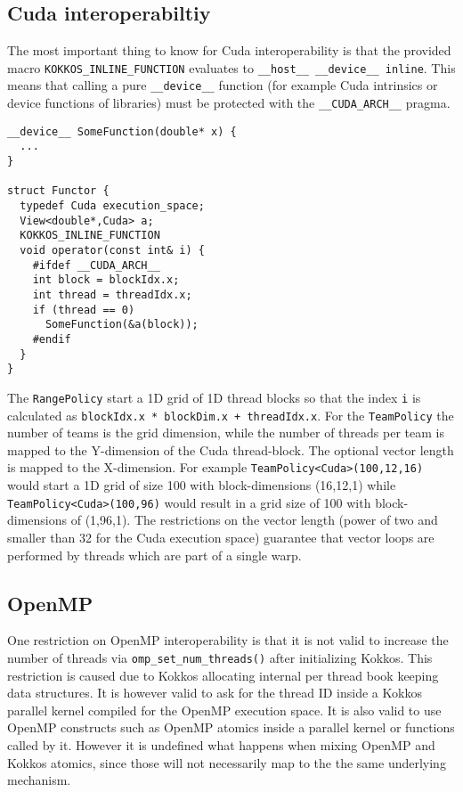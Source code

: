 \subsection{Cuda interoperabiltiy}

The most important thing to know for Cuda interoperability is that the provided macro
\lstinline|KOKKOS_INLINE_FUNCTION| evaluates to 
\lstinline|__host__ __device__ inline|. This means that calling a pure
\lstinline|__device__| function (for example Cuda intrinsics or device 
functions of libraries) must be protected with the \lstinline|__CUDA_ARCH__|
pragma.

\begin{lstlisting}
__device__ SomeFunction(double* x) {
  ...
}

struct Functor {
  typedef Cuda execution_space;
  View<double*,Cuda> a;
  KOKKOS_INLINE_FUNCTION
  void operator(const int& i) {
    #ifdef __CUDA_ARCH__
    int block = blockIdx.x;
    int thread = threadIdx.x;
    if (thread == 0)
      SomeFunction(&a(block));
    #endif
  }
}
\end{lstlisting}

The \lstinline|RangePolicy| start a 1D grid of 1D thread blocks so that the index 
\lstinline|i| is calculated as \lstinline|blockIdx.x * blockDim.x + threadIdx.x|. 
For the \lstinline|TeamPolicy| the number of teams is the grid dimension, while
the number of threads per team is mapped to the Y-dimension of the Cuda 
thread-block. The optional vector length is mapped to the X-dimension. 
For example \lstinline|TeamPolicy<Cuda>(100,12,16)| would start a 1D grid of size 
100 with block-dimensions (16,12,1) while \lstinline|TeamPolicy<Cuda>(100,96)| would 
result in a grid size of 100 with block-dimensions of (1,96,1). The restrictions on the 
vector length (power of two and smaller than 32 for the Cuda execution space) 
guarantee that vector loops are performed by threads which are part of a single 
warp. 

\subsection{OpenMP}

One restriction on OpenMP interoperability is that it is not valid to increase
the number of threads via \lstinline|omp_set_num_threads()| after initializing 
Kokkos. This restriction is caused due to Kokkos allocating internal per thread
book keeping data structures. It is however valid to ask 
for the thread ID inside a Kokkos parallel kernel compiled for the OpenMP 
execution space. It is also valid to use OpenMP constructs such as OpenMP
atomics inside a parallel kernel or functions called by it. However it is undefined
what happens when mixing OpenMP and Kokkos atomics, since those will not 
necessarily map to the the same underlying mechanism. 



